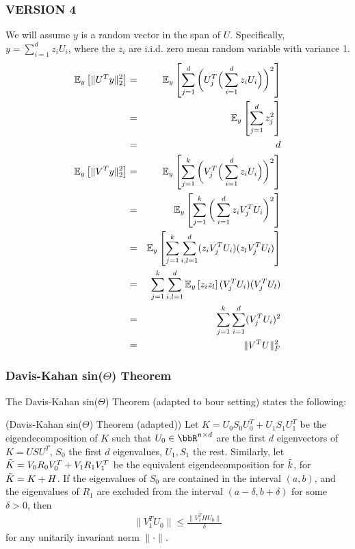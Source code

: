 \subsubsection{VERSION 4}
We will assume $y$ is a random vector in the span of $U$.
Specifically, $y = \sum_{i=1}^d z_i U_i$, where the $z_i$ are i.i.d. zero mean random variable with variance 1.
\begin{eqnarray*}
	\expect{y}{\|U^T y\|_2^2} &=& \expect{y}{\sum_{j=1}^d \bigg( U_j^T \Big(\sum_{i=1}^d z_i U_i\Big)\bigg)^2} \\
	&=& \expect{y}{\sum_{j=1}^d z_j^2} \\
	&=& d \\
	\expect{y}{\|V^T y\|_2^2} &=& \expect{y}{\sum_{j=1}^k \bigg( V_j^T \Big(\sum_{i=1}^d z_i U_i\Big)\bigg)^2} \\
	&=& \expect{y}{\sum_{j=1}^k \bigg(\sum_{i=1}^d z_i V_j^TU_i\bigg)^2} \\
	&=& \expect{y}{\sum_{j=1}^k \sum_{i,l=1}^d (z_i V_j^TU_i) (z_l V_j^TU_l) }\\
	&=& \sum_{j=1}^k \sum_{i,l=1}^d \expect{y}{z_i z_l} (V_j^TU_i) (V_j^TU_l) \\
	&=& \sum_{j=1}^k \sum_{i=1}^d (V_j^TU_i)^2 \\
	&=& \|V^T U\|_F^2\\
\end{eqnarray*}

\subsubsection{Davis-Kahan sin($\Theta$) Theorem}
The Davis-Kahan sin($\Theta$) Theorem (adapted to bour setting) states the following:
\begin{theorem}{(Davis-Kahan sin($\Theta$) Theorem (adapted))}
Let $K=U_0 S_0 U_0^T + U_1 S_1 U_1^T$ be the eigendecomposition of $K$ such that $U_0 \in \RR^{n \times d}$ are the first $d$ eigenvectors of $K=USU^T$, $S_0$ the first $d$ eigenvalues, $U_1,S_1$ the rest.
Similarly, let $\tK = V_0 R_0 V_0^T + V_1 R_1 V_1^T$ be the equivalent eigendecomposition for $\tk$, for $\tK = K + H$.
If the eigenvalues of $S_0$ are contained in the interval $(a,b)$, and the eigenvalues of $R_1$ are excluded from the interval $(a-\delta,b+\delta)$ for some $\delta>0$, then
\begin{eqnarray}
\|V_1^T U_0\| \leq \frac{\|V_1^T H U_0\|}{\delta}
\end{eqnarray}
for any unitarily invariant norm $\|\cdot \|$.
\end{theorem}

